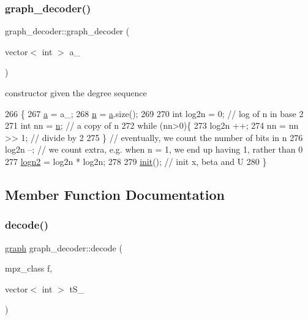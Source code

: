 \subsubsection{\texorpdfstring{graph\+\_\+decoder()}{graph\_decoder()}}
{\footnotesize\ttfamily graph\+\_\+decoder\+::graph\+\_\+decoder (\begin{DoxyParamCaption}\item[{vector$<$ int $>$}]{a\+\_\+ }\end{DoxyParamCaption})}



constructor given the degree sequence 


\begin{DoxyCode}
266 \{
267   \hyperlink{classgraph__decoder_a9dd7c3c11b8a45a12cb7c3c2d2bfa2cc}{a} = a\_;
268   \hyperlink{classgraph__decoder_a6bc1e72b2f7a913d14b789a6c2d92c1e}{n} = \hyperlink{classgraph__decoder_a9dd7c3c11b8a45a12cb7c3c2d2bfa2cc}{a}.size();
269 
270   \textcolor{keywordtype}{int} log2n = 0; \textcolor{comment}{// log of n in base 2}
271   \textcolor{keywordtype}{int} nn = \hyperlink{classgraph__decoder_a6bc1e72b2f7a913d14b789a6c2d92c1e}{n}; \textcolor{comment}{// a copy of n}
272   \textcolor{keywordflow}{while} (nn>0)\{
273     log2n ++;
274     nn = nn >> 1; \textcolor{comment}{// divide by 2}
275   \} \textcolor{comment}{// eventually, we count the number of bits in n}
276   log2n --; \textcolor{comment}{// we count extra, e.g. when n = 1, we end up having 1, rather than 0}
277   \hyperlink{classgraph__decoder_a59663482843ffa5059128bd6ed866f11}{logn2} = log2n * log2n;
278 
279   \hyperlink{classgraph__decoder_a97a9dcd5af21ece86fa91adcb41ca9cc}{init}(); \textcolor{comment}{// init x, beta and U}
280 \}
\end{DoxyCode}


\subsection{Member Function Documentation}
\mbox{\label{classgraph__decoder_a3d2ef81ec6ac66e50c1809f361143922}} 
\subsubsection{\texorpdfstring{decode()}{decode()}}
{\footnotesize\ttfamily \hyperlink{classgraph}{graph} graph\+\_\+decoder\+::decode (\begin{DoxyParamCaption}\item[{mpz\+\_\+class}]{f,  }\item[{vector$<$ int $>$}]{t\+S\+\_\+ }\end{DoxyParamCaption})}



